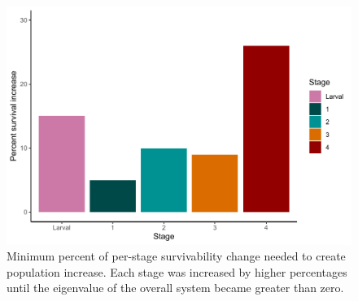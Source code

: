 \documentclass[
  12pt,
]{article}
\begin{document}
\begin{table}

\caption{\label{tab:lifetable}Stable stage distribution and reproductive value of each stage of the blue octopus population matrix given in Figure \ref{WriteMtxRounded}. The survivability (i.e.~the proportion of individuals who survive from stage i to stage i+1) from each stage includes death rate from fishing. Stages 1-4 survivability were calculated by summing up the proportion of individuals surviving and staying within a stage every month (\(P_i\)) and the proportion of individuals surviving and growing every month (\(G_i\)). Larval survivability of 0.0001328 was calculated by dividing the estimated number of larvae surviving back to stage 1 (\(F_4\)) by the average estimated reproductive output of \emph{O. cyanea}. \label{lifetable}}
\centering
{}
\end{table}



\begin{figure}
\centering
\includegraphics{Wulfing_Thesis_files/figure-latex/stages-1.pdf}
\caption{\label{fig:stages}Minimum percent of per-stage survivability change needed to create population increase. Each stage was increased by higher percentages until the eigenvalue of the overall system became greater than zero. \label{stages}}
\end{figure}
\end{document}
